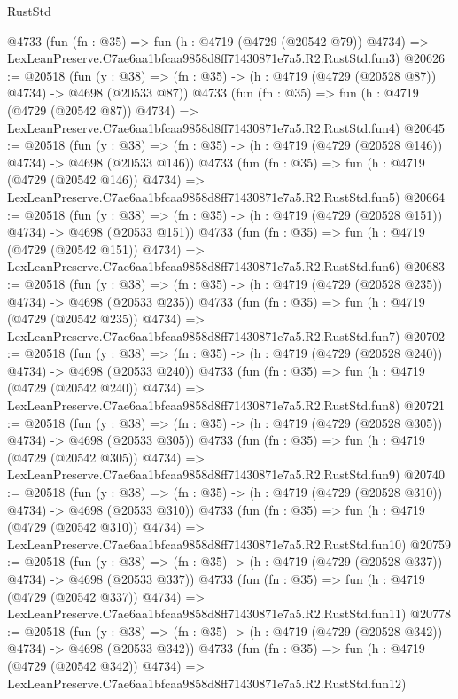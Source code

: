 \begin{lexlean}{RustStd}
\begin{coremodule}
    @4733
    (fun (fn : @35) =>
    fun (h : @4719 (@4729 (@20542 @79)) @4734) =>
    LexLeanPreserve.C7ae6aa1bfcaa9858d8ff71430871e7a5.R2.RustStd.fun3)
@20626 := @20518
    (fun (y : @38) => (fn : @35) -> (h : @4719 (@4729 (@20528 @87)) @4734) -> @4698 (@20533 @87))
    @4733
    (fun (fn : @35) =>
    fun (h : @4719 (@4729 (@20542 @87)) @4734) =>
    LexLeanPreserve.C7ae6aa1bfcaa9858d8ff71430871e7a5.R2.RustStd.fun4)
@20645 := @20518
    (fun (y : @38) => (fn : @35) -> (h : @4719 (@4729 (@20528 @146)) @4734) -> @4698 (@20533 @146))
    @4733
    (fun (fn : @35) =>
    fun (h : @4719 (@4729 (@20542 @146)) @4734) =>
    LexLeanPreserve.C7ae6aa1bfcaa9858d8ff71430871e7a5.R2.RustStd.fun5)
@20664 := @20518
    (fun (y : @38) => (fn : @35) -> (h : @4719 (@4729 (@20528 @151)) @4734) -> @4698 (@20533 @151))
    @4733
    (fun (fn : @35) =>
    fun (h : @4719 (@4729 (@20542 @151)) @4734) =>
    LexLeanPreserve.C7ae6aa1bfcaa9858d8ff71430871e7a5.R2.RustStd.fun6)
@20683 := @20518
    (fun (y : @38) => (fn : @35) -> (h : @4719 (@4729 (@20528 @235)) @4734) -> @4698 (@20533 @235))
    @4733
    (fun (fn : @35) =>
    fun (h : @4719 (@4729 (@20542 @235)) @4734) =>
    LexLeanPreserve.C7ae6aa1bfcaa9858d8ff71430871e7a5.R2.RustStd.fun7)
@20702 := @20518
    (fun (y : @38) => (fn : @35) -> (h : @4719 (@4729 (@20528 @240)) @4734) -> @4698 (@20533 @240))
    @4733
    (fun (fn : @35) =>
    fun (h : @4719 (@4729 (@20542 @240)) @4734) =>
    LexLeanPreserve.C7ae6aa1bfcaa9858d8ff71430871e7a5.R2.RustStd.fun8)
@20721 := @20518
    (fun (y : @38) => (fn : @35) -> (h : @4719 (@4729 (@20528 @305)) @4734) -> @4698 (@20533 @305))
    @4733
    (fun (fn : @35) =>
    fun (h : @4719 (@4729 (@20542 @305)) @4734) =>
    LexLeanPreserve.C7ae6aa1bfcaa9858d8ff71430871e7a5.R2.RustStd.fun9)
@20740 := @20518
    (fun (y : @38) => (fn : @35) -> (h : @4719 (@4729 (@20528 @310)) @4734) -> @4698 (@20533 @310))
    @4733
    (fun (fn : @35) =>
    fun (h : @4719 (@4729 (@20542 @310)) @4734) =>
    LexLeanPreserve.C7ae6aa1bfcaa9858d8ff71430871e7a5.R2.RustStd.fun10)
@20759 := @20518
    (fun (y : @38) => (fn : @35) -> (h : @4719 (@4729 (@20528 @337)) @4734) -> @4698 (@20533 @337))
    @4733
    (fun (fn : @35) =>
    fun (h : @4719 (@4729 (@20542 @337)) @4734) =>
    LexLeanPreserve.C7ae6aa1bfcaa9858d8ff71430871e7a5.R2.RustStd.fun11)
@20778 := @20518
    (fun (y : @38) => (fn : @35) -> (h : @4719 (@4729 (@20528 @342)) @4734) -> @4698 (@20533 @342))
    @4733
    (fun (fn : @35) =>
    fun (h : @4719 (@4729 (@20542 @342)) @4734) =>
    LexLeanPreserve.C7ae6aa1bfcaa9858d8ff71430871e7a5.R2.RustStd.fun12)

\end{coremodule}
\end{lexlean}
